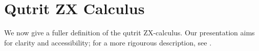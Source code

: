 \section{Qutrit ZX Calculus}\label{app:qutrit_zx_calculus}


We now give a fuller definition of the qutrit ZX-calculus. Our presentation aims for clarity and accessibility; for a more rigourous description, see \cite{harny_completeness}.

